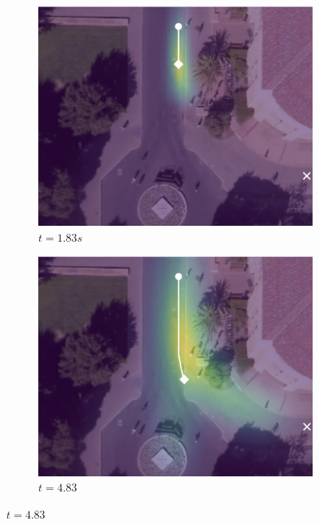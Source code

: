 \documentclass[letterpaper,10pt,conference]{ieeetran}
\begin{document}
\begin{figure}
	\centering
	\begin{subfigure}[b]{.45\linewidth}
		\includegraphics[width=\linewidth]{./figures/FirstPage/gates_1_2_t=55.jpg}
		\caption{$t=1.83s$}
	\end{subfigure}
		\begin{subfigure}[b]{.45\linewidth}
			\includegraphics[width=\linewidth]{./figures/FirstPage/gates_1_2_t=145.jpg}
			\caption{$t=4.83$}
		\end{subfigure}
	

\end{figure}
\end{document}
